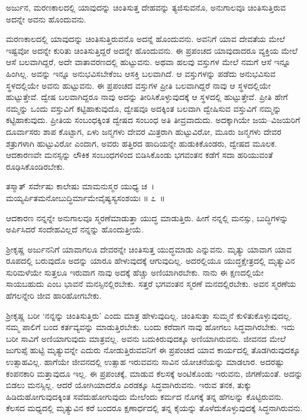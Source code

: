 \newpage

\begin{artha}
ಅರ್ಜುನ, ಮರಣಕಾಲದಲ್ಲಿ ಯಾವುದನ್ನು ಚಿಂತಿಸುತ್ತ ದೇಹವನ್ನು ತ್ಯಜಿಸುವನೊ, ಅನುಗಾಲವೂ ಚಿಂತಿಸುತ್ತಿರುವ ಅದನ್ನೇ ಅವನು ಹೊಂದುವನು.
\end{artha}

ಮರಣಕಾಲದಲ್ಲಿ ಯಾವುದನ್ನು ಚಿಂತಿಸುತ್ತಿರುವನೊ ಅದನ್ನೆ ಹೊಂದುವನು. ಅವನಿಗೆ ಯಾವ ದೇವತೆಯ ಮೇಲೆ ಇಷ್ಟವೋ ಅದನ್ನೇ ಕುರಿತು ಚಿಂತಿಸುತ್ತಿದ್ದರೆ ಅದನ್ನೇ ಹೊಂದುವನು. ಈ ಪ್ರಪಂಚದ ಯಾವುದಾದರೂ ವ್ಯಕ್ತಿಯ ಮೇಲೆ ಆಸೆ ಬಲವಾಗಿದ್ದರೆ, ಅದೇ ವಾತಾವರಣದಲ್ಲಿ ಹುಟ್ಟುವನು. ಅಥವಾ ಹಲವು ವಸ್ತುಗಳ ಮೇಲೆ ನಮಗೆ ಆಸೆ ಇನ್ನೂ ಹಿಂಗಿಲ್ಲ. ಅವನ್ನು ಇನ್ನೂ ಅನುಭವಿಸಬೇಕೆಂಬ ಆಸಕ್ತಿ ಬಲವಾಗಿದೆ. ಆ ವಸ್ತುಗಳನ್ನು ಪಡೆದು ಅನುಭವಿಸುವ ಸ್ಥಳದಲ್ಲಿಯೇ ಅವನು ಹುಟ್ಟುವನು. ಈ ಪ್ರಪಂಚದ ವಸ್ತುಗಳ ಪ್ರೀತಿ ಬಲವಾಗಿದ್ದರೆ ನಾವು ಆ ಸ್ಥಳದಲ್ಲಿಯೇ ಹುಟ್ಟುತ್ತೇವೆ. ದ್ವೇಷ ಬಲವಾಗಿದ್ದರೂ ನಾವು ಅದನ್ನು ತೀರಿಸಿಕೊಳ್ಳುವುದಕ್ಕೆ ಆ ಸ್ಥಳದಲ್ಲಿ ಹುಟ್ಟುತ್ತೇವೆ. ಪ್ರೀತಿ ಹೇಗೆ ನಮ್ಮನ್ನು ಒಂದು ವಸ್ತುವಿಗೆ ಕಟ್ಟಿಹಾಕುವುದೊ, ದ್ವೇಷವೂ ಅದಕ್ಕಿಂತ ಬಲವಾಗಿ ದ್ವೇಷಿಸುವ ವಸ್ತುವಿಗೆ ನಮ್ಮನ್ನು ಕಟ್ಟಿಹಾಕುವುದು. ಪ್ರೀತಿಯ ಸಂಬಂಧಕ್ಕಿಂತ ದ್ವೇಷದ ಸಂಬಂಧ ಅತಿ ತೀವ್ರವಾದುದು. ಅದಕ್ಕಾಗಿಯೇ ಜಯ–ವಿಜಯರಿಗೆ ದೂರ್ವಾಸರು ಶಾಪ ಕೊಟ್ಟಾಗ, ಏಳು ಜನ್ಮಗಳು ದೇವರ ಮಿತ್ರರಾಗಿ ಹುಟ್ಟುವಿರೋ, ಮೂರು ಜನ್ಮಗಳು ದೇವರ ಶತ್ರುಗಳಾಗಿ ಹುಟ್ಟುವಿರೋ ಎಂದಾಗ, ಅವರು ಹತ್ತಿರದ ಹಾದಿಯನ್ನೇ ಹುಡುಕಿಕೊಂಡರು, ದ್ವೇಷದ ಮೂಲಕ. ಆದಕಾರಣವೇ ಮನಸ್ಸನ್ನು ಲೌಕಿಕ ಸಂಬಂಧಗಳಿಂದ ಬಿಡಿಸಿಕೊಂಡು ಭಗವಂತನ ಕಡೆಗೆ ಸದಾ ಹರಿಯುವಂತೆ ರೂಢಿಸಿಕೊಂಡಿರಬೇಕು.

\begin{shloka}
ತಸ್ಮಾತ್ ಸರ್ವೇಷು ಕಾಲೇಷು ಮಾಮನುಸ್ಮರ ಯುಧ್ಯ ಚ~।\\ಮಯ್ಯರ್ಪಿತಮನೋಬುದ್ಧಿರ್ಮಾಮೇವೈಷ್ಯಸ್ಯಸಂಶಯಃ \hfill॥ ೭~॥
\end{shloka}

\begin{artha}
ಆದಕಾರಣ ನನ್ನನ್ನೇ ಅನುಗಾಲವೂ ಸ್ಮರಣೆಮಾಡುತ್ತಾ ಯುದ್ಧ ಮಾಡುತ್ತಿರು. ಹೀಗೆ ನನ್ನಲ್ಲಿ ಮನಸ್ಸು, ಬುದ್ಧಿಗಳನ್ನು ಅರ್ಪಿಸಿದರೆ ಸಂದೇಹವಿಲ್ಲದೆ ನನ್ನನ್ನು ಹೊಂದುತ್ತೀಯೆ.
\end{artha}

ಶ‍್ರೀಕೃಷ್ಣ ಅರ್ಜುನನಿಗೆ ಯಾವಾಗಲೂ ದೇವರನ್ನೇ ಚಿಂತಿಸುತ್ತ ಯುದ್ಧಮಾಡು ಎನ್ನುವನು. ಮೃತ್ಯು ಯಾವಾಗ ಯಾವ ರೂಪದಲ್ಲಿ ಬರುವುದೊ ಅದನ್ನು ಯಾರೂ ಹೇಳುವುದಕ್ಕೆ ಆಗುವುದಿಲ್ಲ. ಅದರಲ್ಲಿಯೂ ಯುದ್ಧಕ್ಷೇತ್ರದಲ್ಲಿ ಮೃತ್ಯುವಿನ ಸುರಿಮಳೆಯೇ ಸುತ್ತಲೂ ಇರುವಾಗ ನಾವು ಅದಕ್ಕೆ ಹೆಚ್ಚು ಅಣಿಯಾಗಿರಬೇಕು. ನಾನು ಈ ಕ್ಷಣದಲ್ಲಿಯೇ ಸಾಯಬಹುದು ಎಂಬ ಭಾವನೆ ಮನಸ್ಸಿನಲ್ಲಿರಬೇಕು. ಸತ್ತರೆ ಭಗವಂತನ ಸ್ಮರಣೆ ಮನದಲ್ಲಿರಬೇಕು. ಅವನ ಸ್ಮರಣೆಯ ಹೆಗಲನ್ನೇರಿ ಜೀವ ಹಾರಿಹೋಗಬೇಕು.

ಶ‍್ರೀಕೃಷ್ಣ ಬರೀ ‘ನನ್ನನ್ನು ಚಿಂತಿಸುತ್ತಿರು’ ಎಂದು ಮಾತ್ರ ಹೇಳುವುದಿಲ್ಲ. ಚಿಂತಿಸುತ್ತಾ ಸುಮ್ಮನೆ ಕುಳಿತುಕೊಳ್ಳುವುದಲ್ಲ. ನಮ್ಮ ಪಾಲಿಗೆ ಬಂದ ಕರ್ತವ್ಯವನ್ನು ಮಾಡುತ್ತಿರಬೇಕು. ಬಂದು ಕರೆದಾಗ ನಾವು ಹೋಗಲು ಸಿದ್ಧವಾಗಿರಬೇಕು. ಇದು ಬರೀ ಸಾವಿಗೆ ಅಣಿಯಾಗುವುದು ಮಾತ್ರವಲ್ಲ. ಅವನು ಬದುಕಿರುವುದಕ್ಕೂ ಅಣಿಯಾಗಿರುವನು. ಜೀವನದ ಮೇಲೆ ಜುಗುಪ್ಸೆ ಹುಟ್ಟಿ ಮೃತ್ಯುವನ್ನೇ ಎದುರು ನೋಡುತ್ತಿರುವವನಿಗೆ ಈ ಪ್ರಪಂಚದ ಯಾವ ಕಾರ್ಯದಲ್ಲಿ ತೊಡಗಿರುವುದಕ್ಕೂ ಉತ್ಸಾಹವಿಲ್ಲ. ಹಾಗೆಯೇ ಜೀವನದಲ್ಲಿ ಉತ್ಸಾಹ ಇರುವವನು ಸಾವಿನ ಯೋಚನೆಯನ್ನು ಮಾಡಲಾರ. ಅದರಷ್ಟು ಕಂಪನಕಾರಿ ಮತ್ತಾವುದೂ ಇಲ್ಲ. ಈ ಪ್ರಪಂಚಕ್ಕೆ, ಮಾಡುವ ಕೆಲಸಕ್ಕೆ ಅಂಟಿಕೊಂಡು ಇರುವನು, ಜಿಗಣೆಯಂತೆ. ಅದನ್ನು ಬಿಡಲು ಮನಸ್ಸಿಲ್ಲ. ಆದರೆ ಯೋಗಿಯಾದರೊ ಎರಡಕ್ಕೂ ಸಿದ್ಧವಾಗಿರುವನು. ಇರುವ ತನಕ, ತುಕ್ಕು ಹಿಡಿದುಹೋಗುವುದಕ್ಕಿಂತ ಸವೆದುಹೋಗುವುದು ಮೇಲೆಂದು ಕರ್ಮದ ನೊಗಕ್ಕೆ ತನ್ನ ಹೆಗಲನ್ನು ಕೊಟ್ಟಿರುವನು. ಕೆಲಸದ ಮಧ್ಯದಲ್ಲಿ ಮೃತ್ಯುವಿನ ಕರೆ ಬಂದರೂ ಕ್ಷಣಾರ್ಧದಲ್ಲಿ ತನ್ನ ಕೈಯನ್ನು ತೊಳೆದುಕೊಳ್ಳುವುದಕ್ಕೆ ಸಿದ್ಧನಾಗಿರುವನು.

